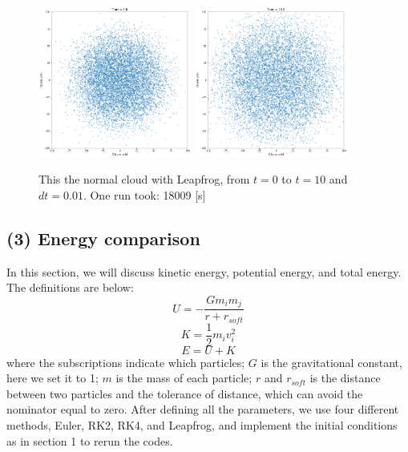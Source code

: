 \documentclass[12pt]{article}
\begin{document}
\begin{figure}[H]
    \includegraphics[width = 0.45\textwidth]{./LF/8.png} 
    \includegraphics[width = 0.45\textwidth]{./LF/10.png}  
    \caption{This the normal cloud with Leapfrog, from $t=0$ to $t=10$ and $dt=0.01$. One run took: 18009 [s]}
    \label{LF}
  \end{figure}

  \subsection{(3) Energy comparison}
  In this section, we will discuss kinetic energy, potential energy, and total energy. The definitions are below:
  \[U = -\frac{Gm_{i}m_{j}}{r + r_{soft}}\]
  \[K = \frac{1}{2}m_{i}v_{i}^{2}\]
  \[E = U + K\]
  where the subscriptions indicate which particles; $G$ is the gravitational constant, here we set it to 1; $m$ is the mass of each particle; $r$ and $r_{soft}$ is the distance between two particles and the tolerance of distance, which can avoid the nominator equal to zero. After defining all the parameters, we use four different methods, Euler, RK2, RK4, and Leapfrog, and implement the initial conditions as in section 1 to rerun the codes.
  \newline
\end{document}
